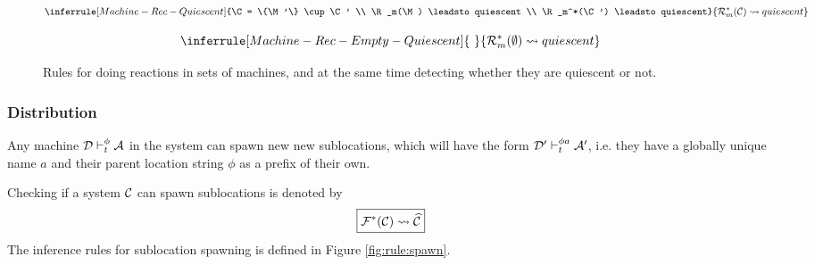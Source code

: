 \begin{figure}[!ht]
{\begin{minipage}{0.97\textwidth}
\begin{equation*}
\inferrule[Machine-Rec-Quiescent]
{\C = \{\M'\} \cup \C'
\\ \R_m(\M) \leadsto quiescent
\\ \R_m^*(\C') \leadsto quiescent}
{\R_m^*(\C) \leadsto quiescent}
\end{equation*}

\begin{equation*}
\inferrule[Machine-Rec-Empty-Quiescent]
{~}
{\R_m^*(\emptyset) \leadsto quiescent}
\end{equation*}

\end{minipage}}
\caption{Rules for doing reactions in sets of machines, and at the same time
detecting whether they are quiescent or not.\label{fig:rule:machine}}
\end{figure}

\newpage

\subsubsection{Distribution}

Any machine $\mathcal{D} \vdash_t^\phi \mathcal{A}$ in the system can spawn new new sublocations,
which will have the form $\mathcal{D}' \vdash_t^{\phi a} \mathcal{A}'$, i.e. they have a globally
unique name $a$ and their parent location string $\phi$ as a prefix of their
own.

Checking if a system $\mathcal{C}$ can spawn sublocations is denoted by
\begin{equation*}
\boxed{\mathcal{F}^*(\mathcal{C}) \leadsto \widehat{\mathcal{C}}}
\end{equation*}
The inference rules for sublocation spawning is defined in Figure
\ref{fig:rule:spawn}.

